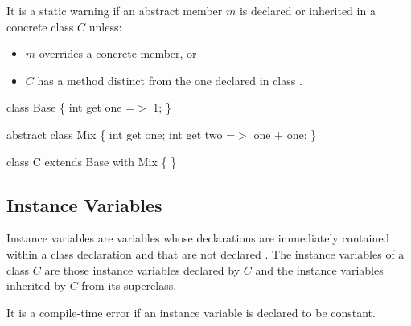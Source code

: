 \documentclass{article}
\newcommand{\code}[1]{{\sf #1}}
\begin{document}

\LMHash{}
It is a static warning if an abstract member $m$ is declared or inherited in a concrete class $C$ unless:
\begin{itemize}
\item  $m$ overrides a concrete member, or 
\item $C$ has a  method distinct from the one declared in class .
\end{itemize}


\begin{dartCode}
 class Base \{
    int get one =$>$ 1;
 \}

 abstract class Mix \{
    int get one;
    int get two =$>$ one + one;
 \}

 class C extends Base with Mix \{ \}
\end{dartCode}


\subsection{Instance Variables}

\LMHash{}
Instance variables are variables whose declarations are immediately contained within a class declaration and that are not declared \STATIC{}. The instance variables of a class $C$ are those instance variables declared by $C$ and the instance variables inherited by $C$ from its superclass.

\LMHash{}
It is a compile-time error if an instance variable is declared to be constant.
\end{document}
